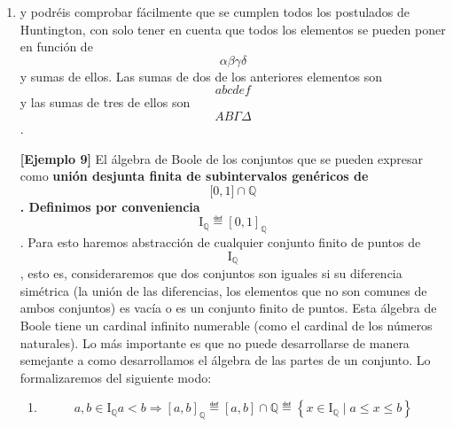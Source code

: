 \begin{enumerate}
\def\labelenumi{\arabic{enumi}.}
\setcounter{enumi}{2}
\item
  y podréis comprobar fácilmente que se cumplen todos los postulados de
  Huntington, con solo tener en cuenta que todos los elementos se pueden
  poner en función de \[\alpha\beta\gamma\delta\]y sumas de ellos. Las
  sumas de dos de los anteriores elementos son \[abcdef\]y las sumas de
  tres de ellos son \[ΑΒ\Gamma\Delta\].

  \textbf{{[}Ejemplo 9{]}} El álgebra de Boole de los conjuntos que se
  pueden expresar como \textbf{unión des\-junta finita de subintervalos
  genéricos de \[\lbrack 0,1\rbrack \cap \mathbb{Q}\]. Definimos por
  conveniencia
  \[\mathbf{\mathrm{I}}_{\mathbb{Q}} ≝ \left\lbrack {0,1} \right\rbrack_{\mathbb{Q}}\]}.
  Para esto haremos abs\-tracción de cualquier conjunto finito de puntos
  de \textbf{\[\mathbf{\mathrm{I}}_{\mathbb{Q}}\]}, esto es,
  consideraremos que dos conjuntos son iguales si su diferencia
  simétrica (la unión de las diferencias, los elementos que no son
  comunes de ambos conjuntos) es vacía o es un conjunto finito de
  puntos. Esta álgebra de Boole tiene un cardinal infinito numerable
  (como el cardinal de los números naturales). Lo más importante es que
  no puede desarrollarse de manera semejante a como desarrolla\-mos el
  álgebra de las partes de un conjunto. Lo formalizaremos del siguiente
  modo:

  \begin{enumerate}
  \def\labelenumii{\arabic{enumii}.}
  \setcounter{enumii}{1}
  \item
    \[a,{b \in \mathbf{\mathrm{I}}_{\mathbb{Q}}}{a < b}\Rightarrow\left\lbrack {a,b} \right\rbrack_{\mathbb{Q}} ≝ {\left\lbrack {a,b} \right\rbrack \cap \mathbb{Q}} ≝ \left\{ {{x \in \mathbf{\mathrm{I}}_{\mathbb{Q}}} \mid {{a \leq x} \leq b}} \right\}\]


\end{enumerate}
\end{enumerate}
